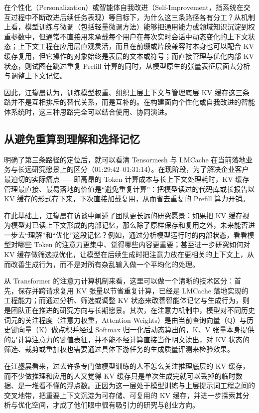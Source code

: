 \documentclass[UTF8,a4paper,11pt,fontset=fandol]{ctexart}
\begin{document}
在个性化（Personalization）或智能体自我改进（Self-Improvement，指系统在交互过程中不断改进后续任务表现）等目标下，为什么这三条路径各有分工？从机制上看，模型训练与微调（包括轻量微调方法）能够把通用能力或领域知识沉淀到权重参数中，但通常不直接用来承载每个用户在每次实时会话中动态变化的上下文状态；上下文工程在应用层直观灵活，而且在前缀或片段兼容时本身也可以配合 KV 缓存复用，但它操作的对象始终是表层的文本或符号；而直接管理与优化内部 KV 状态，则试图在跳过重复 Prefill 计算的同时，从模型原生的张量表征层面去分析与调整上下文记忆。

因此，江鋆晨认为，训练模型权重、组织上层上下文与管理底层 KV 缓存这三条路并不是互相排斥的替代关系，而是互补的。在构建面向个性化或自我改进的智能体系统时，这三种思路完全可以结合使用、协同演进。

\subsection{从避免重算到理解和选择记忆}
明确了第三条路径的定位后，就可以看清 Tensormesh 与 LMCache 在当前落地业务与长远研究愿景上的区分（01:29:42–01:31:14）。在现阶段，为了解决企业客户最迫切的实际痛点——即高昂的 Token 计算成本与长上下文处理耗时，KV 缓存管理最直接、最易落地的价值是“避免重复计算”：把模型读过的代码库或长报告以 KV 缓存的形式存下来，下次直接加载复用，从而省去重复的 Prefill 算力开销。

在此基础上，江鋆晨在访谈中阐述了团队更长远的研究愿景：如果把 KV 缓存视为模型对已读上下文形成的内部记忆，那么除了原样保存和复用之外，未来能否进一步去“理解”和“优化”这段记忆？例如，通过分析模型运行时的内部状态，看看模型对哪些 Token 的注意力更集中、觉得哪些内容更重要；甚至进一步研究如何对 KV 缓存做筛选或优化，让模型在后续生成时把注意力放在更相关的上下文上，从而改善生成行为，而不是对所有杂乱输入做一个平均化的处理。

从 Transformer 的注意力计算机制来看，这里可以做一个清晰的技术区分：首先，保存并跨请求复用 KV 张量以节省重复计算，已经是 LMCache 落地实现的工程能力；而通过分析、筛选或调整 KV 状态来改善智能体记忆与生成行为，则是团队正在推进的研究方向与长期愿景。其次，在注意力机制中，模型对不同历史词元的关注程度（注意力权重，Attention Weights）是由当前查询向量（Q）与历史键向量（K）做点积并经过 Softmax 归一化后动态算出的，K、V 张量本身提供的是计算注意力的键值表征，并不能不经计算直接当作明文读出，对 KV 状态的筛选、裁剪或重加权也需要通过具体下游任务的生成质量评测来检验效果。

在江鋆晨看来，过去许多专门做模型训练的人不怎么关注推理底层的 KV 缓存，而不少做推理和应用的人又觉得 KV 缓存只是单次生成完就可以丢掉的临时数据、是一堆看不懂的浮点数。正因为这一层处于模型训练与上层提示词工程之间的交叉地带，把重要上下文沉淀为可存储、可复用的 KV 缓存，并进一步探索其分析与优化空间，才成了他们眼中很有吸引力的研究与创业方向。
\end{document}
